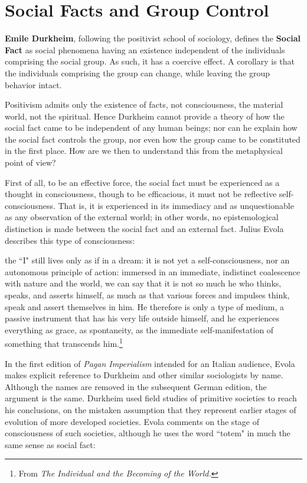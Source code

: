 \section{Social Facts and Group Control}

\textbf{Emile Durkheim}, following the positivist school of sociology, defines the \textbf{Social Fact} as social phenomena having an existence independent of the individuals comprising the social group. As such, it has a coercive effect. A corollary is that the individuals comprising the group can change, while leaving the group behavior intact.

Positivism admits only the existence of facts, not consciousness, the material world, not the spiritual. Hence Durkheim cannot provide a theory of how the social fact came to be independent of any human beings; nor can he explain how the social fact controls the group, nor even how the group came to be constituted in the first place. How are we then to understand this from the metaphysical point of view?

First of all, to be an effective force, the social fact must be experienced as a thought in consciousness, though to be efficacious, it must not be reflective self-consciousness. That is, it is experienced in its immediacy and as unquestionable as any observation of the external world; in other words, no epistemological distinction is made between the social fact and an external fact. Julius Evola describes this type of consciousness:

\begin{quotex}
the ``I" still lives only as if in a dream: it is not yet a self-consciousness, nor an autonomous principle of action: immersed in an immediate, indistinct coalescence with nature and the world, we can say that it is not so much he who thinks, speaks, and asserts himself, as much as that various forces and impulses think, speak and assert themselves in him. He therefore is only a type of medium, a passive instrument that has his very life outside himself, and he experiences everything as grace, as spontaneity, as the immediate self-manifestation of something that transcends him.\footnote{From \emph{The Individual and the Becoming of the World.}}

\end{quotex}
In the first edition of \emph{Pagan Imperialism} intended for an Italian audience, Evola makes explicit reference to Durkheim and other similar sociologists by name. Although the names are removed in the subsequent German edition, the argument is the same. Durkheim used field studies of primitive societies to reach his conclusions, on the mistaken assumption that they represent earlier stages of evolution of more developed societies. Evola comments on the stage of consciousness of such societies, although he uses the word ``totem" in much the same sense as social fact:


